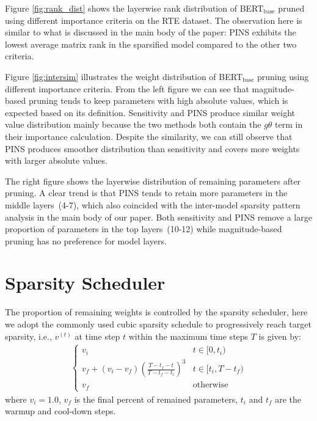 \documentclass[11pt]{article}
\newcommand{\figref}[1]{Figure \ref{#1}}
\begin{document}
\figref{fig:rank_dist} shows the layerwise rank distribution of BERT$_{\text{base}}$ pruned using different importance criteria on the RTE dataset. The observation here is similar to what is discussed in the main body of the paper: PINS exhibits the lowest average matrix rank in the sparsified model compared to the other two criteria.

\figref{fig:intersim} illustrates the weight distribution of BERT$_{\text{base}}$ pruning using different importance criteria. From the left figure we can see that magnitude-based pruning tends to keep parameters with high absolute values, which is expected based on its definition. Sensitivity and PINS produce similar weight value distribution mainly because the two methods both contain the $g\theta$ term in their importance calculation. Despite the similarity, we can still observe that PINS produces smoother distribution than sensitivity and covers more weights with larger absolute values. 


The right figure shows the layerwise distribution of remaining parameters after pruning. A clear trend is that PINS tends to retain more parameters in the middle layers~(4-7), which also coincided with the inter-model sparsity pattern analysis in the main body of our paper. Both sensitivity and PINS remove a large proportion of parameters in the top layers~(10-12) while magnitude-based pruning has no preference for model layers.




\section{Sparsity Scheduler}
The proportion of remaining weights is controlled by the sparsity scheduler, here  we adopt the commonly used  cubic sparsity schedule to progressively reach target sparsity, i.e., $v^{(t)}$ at time step $t$ within the maximum time steps $T$ is given by:
\begin{align}
	\begin{cases} 
		v_i & t\in [0, t_i) \\
		v_f+(v_i-v_f)(\frac{T-t_{f}-t}{T-t_f-t_i})^3 & t\in[t_i, T-t_f) \\
		v_f  & \text{otherwise}  
	\end{cases}
\end{align}
\label{eq:prune}
where $v_i=1.0$, $v_f$ is the final percent of remained parameters, $t_i$ and $t_f$ are the warmup and cool-down steps.
\end{document}
